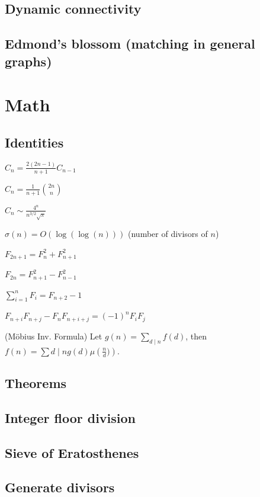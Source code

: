 \subsection{Dynamic connectivity}
\subsection{Edmond's blossom (matching in general graphs)}

\section{Math}
\subsection{Identities}
{
$C_n = \frac{2(2n-1)}{n+1} C_{n-1}$

$C_n = \frac{1}{n+1} \binom{2n}{n}$

$C_n \sim \frac{4^n}{n^{3/2}\sqrt{\pi}}$

$\sigma(n) = O(\log(\log(n)))$ (number of divisors of $n$)

$F_{2n+1} = F_{n}^2 + F_{n+1}^2$

$F_{2n} = F_{n+1}^2 - F_{n-1}^2$

$\sum_{i=1}^n F_i = F_{n+2}-1$

$F_{n+i}F_{n+j} - F_nF_{n+i+j} = (-1)^n F_iF_j$

(Möbius Inv. Formula)
Let $g(n) = \sum_{d\mid n} f(d)$, then $f(n)=\sum{d\mid n} g(d) \mu\left(\frac{n}{d})\right)$.
}
\subsection{Theorems}
\subsection{Integer floor division}
\subsection{Sieve of Eratosthenes}
\subsection{Generate divisors}
